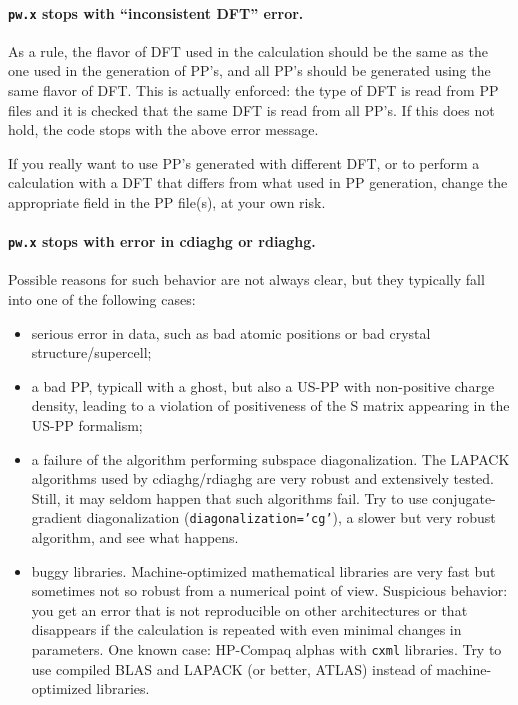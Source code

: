 \documentclass[12pt,a4paper]{article}
\begin{document}
\paragraph{\texttt{pw.x} stops with ``inconsistent DFT'' error.}

As a rule, the flavor  of DFT used in the calculation should be the
same as the one used in the generation of PP's, and all PP's should 
be generated  using the same flavor of DFT. This is actually enforced: 
the type of DFT is read from PP files and it is checked that the same 
DFT is read from all PP's. If this does not hold, the code stops with 
the above error message. 

If you really want to use PP's generated with different DFT, or
to perform a calculation with a DFT that differs from what used in
PP generation, change the appropriate field in the PP file(s), at
your own risk.

\paragraph{\texttt{pw.x} stops with error in cdiaghg or rdiaghg.}

Possible reasons for such behavior are not always clear, but they
typically fall into one of the following cases:
\begin{itemize}
  \item
    serious error in data, such as bad atomic positions or bad crystal
    structure/supercell;
  \item
    a bad PP, typicall with a ghost, but also a US-PP with non-positive
    charge density, leading to a violation of positiveness of the S 
    matrix appearing in the US-PP formalism;
  \item
    a failure of the algorithm performing subspace diagonalization. 
    The LAPACK algorithms used by cdiaghg/rdiaghg are very robust 
    and extensively tested. Still, it may seldom happen that such
    algorithms fail. Try to use conjugate-gradient diagonalization 
    (\texttt{diagonalization='cg'}), a slower but very robust 
    algorithm, and see what happens.
  \item
    buggy libraries. Machine-optimized mathematical libraries are 
    very fast but sometimes not so robust from a numerical point
    of view. Suspicious behavior: you get an error that is not
    reproducible on other architectures or that disappears if the 
    calculation is repeated with even minimal changes in parameters.
    One known case: HP-Compaq alphas with \texttt{cxml} libraries. 
    Try to use compiled BLAS and LAPACK (or better, ATLAS) instead of
    machine-optimized libraries.
\end{itemize}
\end{document}
